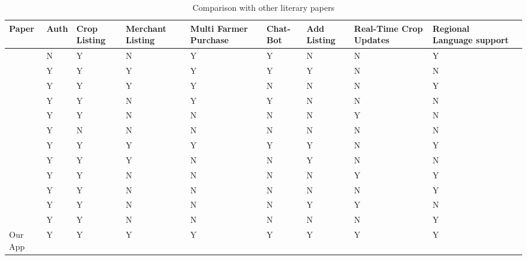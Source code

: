 \documentclass{article}
\begin{document}
\begin{table}[htbp]
  \centering
  \begin{tabular}{|p{1cm}|p{1.2cm}|p{1.2cm}|p{1.2cm}|p{1.2cm}|p{1.2cm}|p{1.2cm}|p{1.2cm}|p{1.2cm}|p{1.5cm}|}
      \hline
      \textbf{Paper} & \textbf{Auth} & \textbf{Crop Listing} & \textbf{Merchant Listing} & \textbf{Multi Farmer Purchase} & \textbf{Chat-Bot} & \textbf{Add Listing} & \textbf{Real-Time Crop Updates} & \textbf{Regional Language support}\\
      \hline
      [1] & N & Y & N & Y & Y & N & N & Y \\
      \hline
      [2] & Y & Y & Y & Y & Y & Y & N & N \\
      \hline
      [3] & Y & Y & Y & Y & N & N & N & Y \\
      \hline
      [4] & Y & Y & N & Y & Y & N & N & N \\
      \hline
      [5] & Y & Y & N & N & N & N & Y & N \\
      \hline
      [6] & Y & N & N & N & N & N & N & N \\
      \hline
      [7] & Y & Y & Y & Y & Y & Y & N & Y \\
      \hline
      [8] & Y & Y & Y & N & N & Y & N & N \\
      \hline
      [9] & Y & Y & N & N & N & N & Y & Y \\
      \hline
      [10] & Y & Y & N & N & N & N & N & Y \\
      \hline
      [11] & Y & Y & N & N & N & Y & Y & N \\
      \hline
      [12] & Y & Y & N & N & N & N & N & Y \\
      \hline
      Our App & Y & Y & Y & Y & Y & Y & Y & Y \\
      \hline
  \end{tabular}
  \caption{Comparison with other literary papers}
  \label{tab:comparison}
\end{table}
\FloatBarrier
\end{document}
